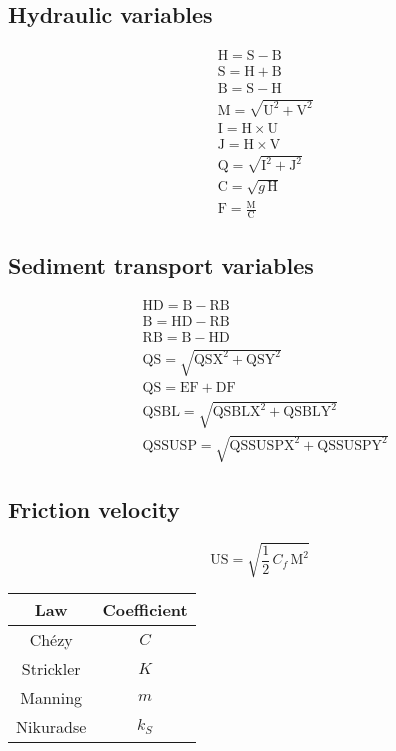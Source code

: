 \documentclass{article}
\newcommand{\B}{\mathrm{B}}
\newcommand{\HAU}{\mathrm{H}}
\newcommand{\SL}{\mathrm{S}}
\newcommand{\U}{\mathrm{U}}
\newcommand{\V}{\mathrm{V}}
\newcommand{\M}{\mathrm{M}}
\newcommand{\I}{\mathrm{I}}
\newcommand{\J}{\mathrm{J}}
\newcommand{\HD}{\mathrm{HD}}
\newcommand{\RB}{\mathrm{RB}}
\newcommand{\EF}{\mathrm{EF}}
\newcommand{\DF}{\mathrm{DF}}
\newcommand{\QS}{\mathrm{QS}}
\newcommand{\QSX}{\mathrm{QSX}}
\newcommand{\QSY}{\mathrm{QSY}}
\newcommand{\QSBL}{\mathrm{QSBL}}
\newcommand{\QSBLX}{\mathrm{QSBLX}}
\newcommand{\QSBLY}{\mathrm{QSBLY}}
\newcommand{\QSSUSP}{\mathrm{QSSUSP}}
\newcommand{\QSSUSPX}{\mathrm{QSSUSPX}}
\newcommand{\QSSUSPY}{\mathrm{QSSUSPY}}
\newcommand{\US}{\mathrm{US}}
\begin{document}
\begin{multicols}{2}

\subsection{Hydraulic variables}
\[\begin{aligned}
& \HAU = \SL - \B\\
& \SL = \HAU + \B\\
& \B = \SL - \HAU\\
& \M = \sqrt{\U^2+\V^2}\\
& \I = \HAU \times \U\\
& \J = \HAU \times \V\\
& \mathrm{Q} = \sqrt{\I^2 + \J^2}\\
& \mathrm{C} = \sqrt{g\,\HAU}\\
& \mathrm{F} = \frac{\M}{\mathrm{C}}
\end{aligned}\]

\subsection{Sediment transport variables}
\[\begin{aligned}
& \HD = \B - \RB\\
& \B = \HD - \RB\\
& \RB = \B - \HD\\
& \QS = \sqrt{\QSX ^2 + \QSY ^2}\\
& \QS = \EF + \DF\\
& \QSBL = \sqrt{\QSBLX ^2 + \QSBLY ^2}\\
& \QSSUSP = \sqrt{\QSSUSPX ^2 + \QSSUSPY ^2}
\end{aligned}\]

\end{multicols}

\subsection{Friction velocity}
\[\US = \sqrt{\frac{1}{2}\,C_f\,\M^2}\]

\begin{center}
  \begin{tabular}{ | c | c | }
    \hline
    Law       & Coefficient \\
    \hline
    Chézy     & $C$ \\
    Strickler & $K$ \\
    Manning   & $m$ \\
    Nikuradse & $k_S$ \\
    \hline
  \end{tabular}
\end{center}
\end{document}
